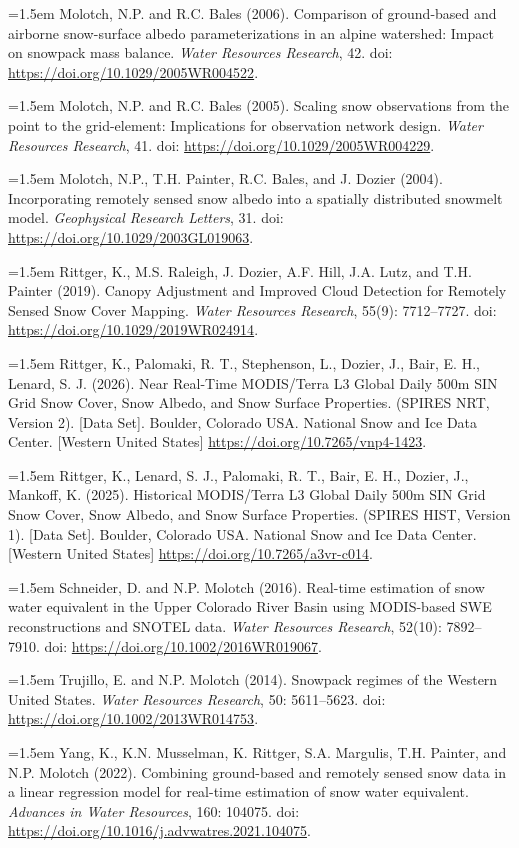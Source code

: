 \documentclass{article}
\begin{document}
\noindent
\hangindent=1.5em
Molotch, N.P. and R.C. Bales (2006). Comparison of ground-based and airborne snow-surface albedo parameterizations in an alpine watershed: Impact on snowpack mass balance. \textit{Water Resources Research}, 42. doi: \url{https://doi.org/10.1029/2005WR004522}.

\noindent
\hangindent=1.5em
Molotch, N.P. and R.C. Bales (2005). Scaling snow observations from the point to the grid-element: Implications for observation network design. \textit{Water Resources Research}, 41. doi: \url{https://doi.org/10.1029/2005WR004229}.

\noindent
\hangindent=1.5em
Molotch, N.P., T.H. Painter, R.C. Bales, and J. Dozier (2004). Incorporating remotely sensed snow albedo into a spatially distributed snowmelt model. \textit{Geophysical Research Letters}, 31. doi: \url{https://doi.org/10.1029/2003GL019063}.

\noindent
\hangindent=1.5em
Rittger, K., M.S. Raleigh, J. Dozier, A.F. Hill, J.A. Lutz, and T.H. Painter (2019). Canopy Adjustment and Improved Cloud Detection for Remotely Sensed Snow Cover Mapping. \textit{Water Resources Research}, 55(9): 7712–7727. doi: \url{https://doi.org/10.1029/2019WR024914}.

\noindent
\hangindent=1.5em
Rittger, K., Palomaki, R. T., Stephenson, L., Dozier, J., Bair, E. H., Lenard, S. J. (2026). Near Real-Time MODIS/Terra L3 Global Daily 500m SIN Grid Snow Cover, Snow Albedo, and Snow Surface Properties. (SPIRES NRT, Version 2). [Data Set]. Boulder, Colorado USA. National Snow and Ice Data Center. [Western United States] \url{https://doi.org/10.7265/vnp4-1423}.

\noindent
\hangindent=1.5em
Rittger, K., Lenard, S. J., Palomaki, R. T., Bair, E. H., Dozier, J., Mankoff, K. (2025). Historical MODIS/Terra L3 Global Daily 500m SIN Grid Snow Cover, Snow Albedo, and Snow Surface Properties. (SPIRES HIST, Version 1). [Data Set]. Boulder, Colorado USA. National Snow and Ice Data Center. [Western United States] \url{https://doi.org/10.7265/a3vr-c014}.

\noindent
\hangindent=1.5em
Schneider, D. and N.P. Molotch (2016). Real-time estimation of snow water equivalent in the Upper Colorado River Basin using MODIS-based SWE reconstructions and SNOTEL data. \textit{Water Resources Research}, 52(10): 7892–7910. doi: \url{https://doi.org/10.1002/2016WR019067}.

\noindent
\hangindent=1.5em
Trujillo, E. and N.P. Molotch (2014). Snowpack regimes of the Western United States. \textit{Water Resources Research}, 50: 5611–5623. doi: \url{https://doi.org/10.1002/2013WR014753}.

\noindent
\hangindent=1.5em
Yang, K., K.N. Musselman, K. Rittger, S.A. Margulis, T.H. Painter, and N.P. Molotch (2022). Combining ground-based and remotely sensed snow data in a linear regression model for real-time estimation of snow water equivalent. \textit{Advances in Water Resources}, 160: 104075. doi: \url{https://doi.org/10.1016/j.advwatres.2021.104075}.
\end{document}
